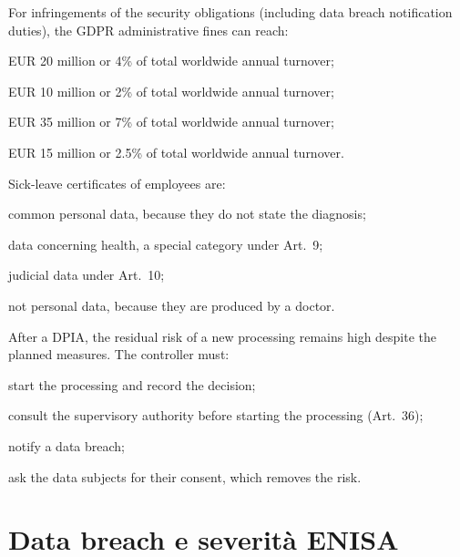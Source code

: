 \begin{domanda}\label{q:sanzioni}
For infringements of the security obligations (including data breach notification duties), the GDPR
administrative fines can reach:
\begin{opzioni}
  \item EUR 20 million or 4\% of total worldwide annual turnover;
  \item EUR 10 million or 2\% of total worldwide annual turnover;
  \item EUR 35 million or 7\% of total worldwide annual turnover;
  \item EUR 15 million or 2.5\% of total worldwide annual turnover.
\end{opzioni}
\end{domanda}

\begin{domanda}\label{q:malattia}
Sick-leave certificates of employees are:
\begin{opzioni}
  \item common personal data, because they do not state the diagnosis;
  \item data concerning health, a special category under Art.~9;
  \item judicial data under Art.~10;
  \item not personal data, because they are produced by a doctor.
\end{opzioni}
\end{domanda}

\begin{domanda}\label{q:dpia}
After a DPIA, the residual risk of a new processing remains high despite the planned measures. The
controller must:
\begin{opzioni}
  \item start the processing and record the decision;
  \item consult the supervisory authority before starting the processing (Art.~36);
  \item notify a data breach;
  \item ask the data subjects for their consent, which removes the risk.
\end{opzioni}
\end{domanda}

\section{Data breach e severità ENISA}

